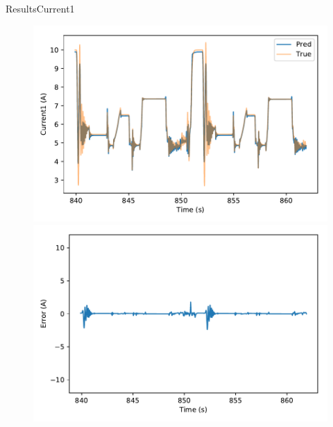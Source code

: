 \documentclass[handout]{beamer}
\begin{document}
\begin{frame}{Results}{Current1}
\begin{center}
  \begin{figure}
  \includegraphics[scale=0.4]{images/current1_pred_vs_time} \\
  \includegraphics[scale=0.4]{images/current1_error_vs_time}
  \end{figure}
\end{center}
\end{frame}
\end{document}
